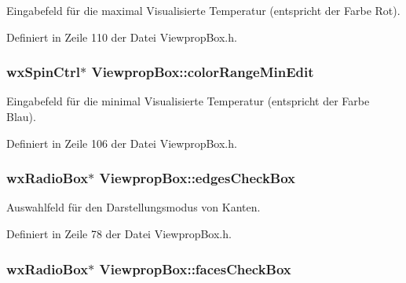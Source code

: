 Eingabefeld für die maximal Visualisierte Temperatur (entspricht der Farbe Rot). 



Definiert in Zeile 110 der Datei Viewprop\-Box.\-h.

\hypertarget{classViewpropBox_a64af7732726775603579fedcf231d5e0}{
\subsubsection[{color\-Range\-Min\-Edit}]{\setlength{\rightskip}{0pt plus 5cm}wx\-Spin\-Ctrl$\ast$ Viewprop\-Box\-::color\-Range\-Min\-Edit\hspace{0.3cm}{\ttfamily [private]}}}\label{classViewpropBox_a64af7732726775603579fedcf231d5e0}


Eingabefeld für die minimal Visualisierte Temperatur (entspricht der Farbe Blau). 



Definiert in Zeile 106 der Datei Viewprop\-Box.\-h.

\hypertarget{classViewpropBox_a42925abd6e515ec8f12e9de662edf39e}{
\subsubsection[{edges\-Check\-Box}]{\setlength{\rightskip}{0pt plus 5cm}wx\-Radio\-Box$\ast$ Viewprop\-Box\-::edges\-Check\-Box\hspace{0.3cm}{\ttfamily [private]}}}\label{classViewpropBox_a42925abd6e515ec8f12e9de662edf39e}


Auswahlfeld für den Darstellungsmodus von Kanten. 



Definiert in Zeile 78 der Datei Viewprop\-Box.\-h.

\hypertarget{classViewpropBox_ad5b2d4c590f1594ae5b0c80251d80005}{
\subsubsection[{faces\-Check\-Box}]{\setlength{\rightskip}{0pt plus 5cm}wx\-Radio\-Box$\ast$ Viewprop\-Box\-::faces\-Check\-Box\hspace{0.3cm}{\ttfamily [private]}}}\label{classViewpropBox_ad5b2d4c590f1594ae5b0c80251d80005}



